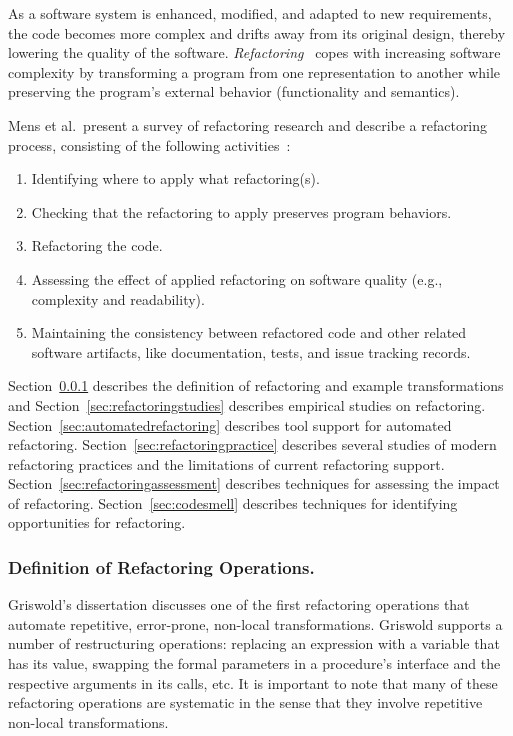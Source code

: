 As a software system is enhanced, modified, and adapted to new requirements, the code becomes more complex and drifts away from its original design, thereby lowering the quality of the software. {\em Refactoring}~\cite{1999:RID,Griswold:1992,Opdyke1992:ROF,Mens2004:SSR} copes with increasing software complexity by transforming a program from one representation to another while preserving the program's external behavior (functionality and semantics).

Mens et al.~present a survey of refactoring research and describe a refactoring process, consisting of the following activities~\cite{Mens2004:SSR}:
\begin{enumerate}
\item Identifying where to apply what refactoring(s).
\item Checking that the refactoring to apply preserves program behaviors.
\item Refactoring the code.
\item Assessing the effect of applied refactoring on software quality (e.g., complexity and readability). 
\item Maintaining the consistency between refactored code and other related software artifacts, like documentation, tests, and issue tracking records.  
\end{enumerate}

Section~\ref{sec:refactoringdefinition} describes the definition of refactoring and example transformations and Section~\ref{sec:refactoringstudies} describes empirical studies on refactoring. Section~\ref{sec:automatedrefactoring} describes tool support for automated refactoring. Section~\ref{sec:refactoringpractice} describes several studies of modern refactoring practices and the limitations of current refactoring support. Section~\ref{sec:refactoringassessment} describes techniques for assessing the impact of refactoring. Section~\ref{sec:codesmell} describes techniques for identifying opportunities for refactoring. 

\subsubsection{Definition of Refactoring Operations.} 
\label{sec:refactoringdefinition} 

Griswold's dissertation \cite{Griswold:1992} discusses one of the first refactoring operations that automate repetitive, error-prone, non-local transformations. Griswold supports a number of restructuring operations: replacing an expression with a variable that has its value, swapping the formal parameters in a procedure's interface and the respective arguments in its calls, etc. It is important to note that many of these refactoring operations are systematic in the sense that they involve repetitive non-local transformations. 

